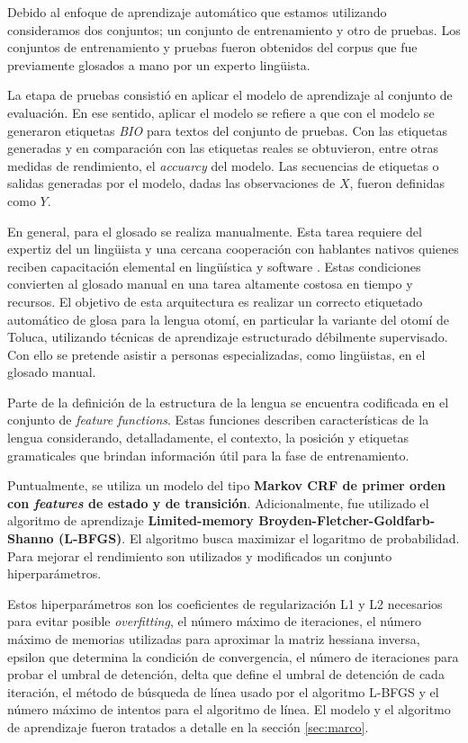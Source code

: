 \documentclass[letterpaper,12pt,oneside]{book}
\theoremstyle{definition}
\begin{document}
Debido al enfoque de aprendizaje automático que estamos utilizando consideramos dos conjuntos; un conjunto de entrenamiento y otro de pruebas. Los conjuntos de entrenamiento y pruebas fueron obtenidos del corpus que fue previamente glosados a mano por un experto lingüista.

La etapa de pruebas consistió en aplicar el modelo de aprendizaje al conjunto de evaluación. En ese sentido, aplicar el modelo se refiere a que con el modelo se generaron etiquetas \textit{BIO} para textos del conjunto de pruebas. Con las etiquetas generadas y en comparación con las etiquetas reales se obtuvieron, entre otras medidas de rendimiento, el \textit{accuarcy} del modelo. Las secuencias de etiquetas o salidas generadas por el modelo, dadas las observaciones de $X$, fueron definidas como $Y$.

En general, para el glosado se realiza manualmente. Esta tarea requiere del expertiz del un lingüista y una cercana cooperación con hablantes nativos quienes reciben capacitación elemental en lingüística y software \citep{moeller2018automatic}. Estas condiciones convierten al glosado manual en una tarea altamente costosa en tiempo y recursos. El objetivo de esta arquitectura es realizar un correcto etiquetado automático de glosa para la lengua otomí, en particular la variante del otomí de Toluca, utilizando técnicas de aprendizaje estructurado débilmente supervisado. Con ello se pretende asistir a personas especializadas, como lingüistas, en el glosado manual.   

Parte de la definición de la estructura de la lengua se encuentra codificada en el conjunto de \textit{feature functions}. Estas funciones describen características de la lengua considerando, detalladamente, el contexto, la posición y etiquetas gramaticales que brindan información útil para la fase de entrenamiento.

Puntualmente, se utiliza un modelo del tipo \textbf{Markov CRF de primer orden con \textit{features} de estado y de transición}. Adicionalmente, fue utilizado el algoritmo de aprendizaje \textbf{Limited-memory Broyden-Fletcher-Goldfarb-Shanno (L-BFGS)}. El algoritmo busca maximizar el logaritmo de probabilidad. Para mejorar el rendimiento son utilizados y modificados un conjunto hiperparámetros.

Estos hiperparámetros son los coeficientes de regularización L1 y L2 necesarios para evitar posible \textit{overfitting}, el número máximo de iteraciones, el número máximo de memorias utilizadas para aproximar la matriz hessiana inversa, epsilon que determina la condición de convergencia, el número de iteraciones para probar el umbral de detención,  delta que define el umbral de detención de cada iteración, el método de búsqueda de línea usado por el algoritmo L-BFGS y el número máximo de intentos para el algoritmo de línea.
El modelo y el algoritmo de aprendizaje fueron tratados a detalle en la sección \ref{sec:marco}.
\end{document}
